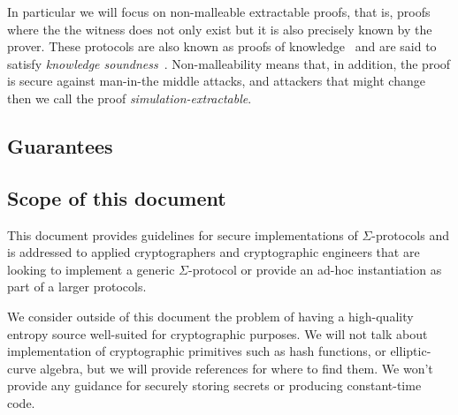 \documentclass[11pt]{article}
\begin{document}
In particular we will focus on non-malleable extractable proofs, that is, proofs where the the witness does not only exist but it is also precisely known by the prover.
These protocols are also known as proofs of knowledge~\cite{STOC:GolMicRac85,STOC:FeiFiaSha87,C:BelGol92} and are said to satisfy \emph{knowledge soundness}~\cite{damgard04}. Non-malleability means that, in addition, the proof is secure against man-in-the middle attacks, and attackers that might change  then we call the proof \emph{simulation-extractable}.


\subsection{Guarantees}
\subsection{Scope of this document}

This document provides guidelines for secure implementations of $\Sigma$-protocols and is addressed to applied cryptographers and cryptographic engineers that are looking to implement a generic
$\Sigma$-protocol or provide an ad-hoc instantiation as part of a larger protocols.

We consider outside of this document the problem of having a high-quality
entropy source well-suited for crypto\-graphic purposes.
We will not talk about implementation of cryptographic primitives such as hash functions, or elliptic-curve algebra, but we will provide references for where to find them.
We won't provide any guidance for securely storing secrets or producing constant-time code.

\end{document}
